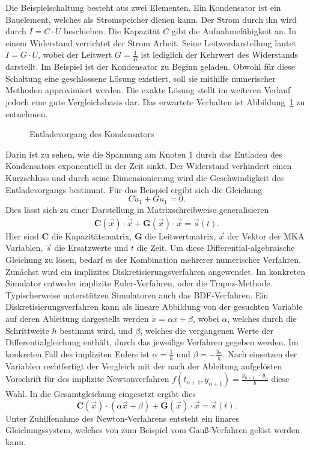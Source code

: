 Die Beispielschaltung besteht aus zwei Elementen. Ein Kondensator ist ein Bauelement, welches als Stromspeicher dienen kann. Der Strom durch ihn wird durch \(I = C \cdot \dot{U}\) beschieben. Die Kapazität \(C\) gibt die Aufnahmefähigkeit an. In einem Widerstand verrichtet der Strom Arbeit. Seine Leitwerdarstellung lautet \(I = G \cdot U\), wobei der Leitwert \(G=\frac{1}{R}\) ist lediglich der Kehrwert des Widerstands darstellt. Im Beispiel ist der Kondensator zu Beginn geladen. Obwohl für diese Schaltung eine geschlossene Lösung existiert, soll sie mithilfe numerischer Methoden approximiert werden. Die exakte Lösung stellt im weiteren Verlauf jedoch eine gute Vergleichsbasis dar. Das erwartete Verhalten ist Abbildung~\ref{fig:entladen} zu entnehmen.
\begin{figure}[ht]
    \centering
    \caption{Entladevorgang des Kondensators}
\label{fig:entladen}
\end{figure}
Darin ist zu sehen, wie die Spannung am Knoten 1 durch das Entladen des Kondensators exponentiell in der Zeit sinkt. Der Widerstand verhindert einen Kurzschluss und durch seine Dimensionierung wird die Geschwindigkeit des Entladevorgangs bestimmt. Für das Beispiel ergibt sich die Gleichung
\begin{displaymath}
    C\dot{u}_1 + Gu_1 = 0.
\end{displaymath}
Dies lässt sich zu einer Darstellung in Matrixschreibweise generalisieren
\begin{displaymath}
    \mathbf{C}(\vec{x}) \cdot \dot{\vec{x}} + \mathbf{G}(\vec{x}) \cdot  \vec{x} = \vec{s}(t).
\end{displaymath}
Hier sind $\mathbf{C}$ die Kapazitätsmatrix, $\mathbf{G}$ die Leitwertmatrix, $\vec{x}$ der Vektor der MKA Variablen, $\vec{s}$ die Ersatzwerte und $t$ die Zeit. Um diese Differential-algebraische Gleichung zu lösen, bedarf es der Kombination mehrerer numerischer Verfahren. Zunächst wird ein implizites Diskretisierungsverfahren angewendet. Im konkreten Simulator entweder implizite Euler-Verfahren, oder die Trapez-Methode. Typischerweise unterstützen Simulatoren auch das BDF-Verfahren. Ein Diskretisierungsverfahren kann als lineare Abbildung von der gesuchten Variable auf deren Ableitung dargestellt werden \(\dot{x} = \alpha x + \beta\), wobei \(\alpha\), welches durch die Schrittweite \(h\) bestimmt wird, und \(\beta\), welches die vergangenen Werte der Differentialgleichung enthält, durch das jeweilige Verfahren gegeben werden. Im konkreten Fall des impliziten Eulers ist \(\alpha = \frac{1}{h}\) und \(\beta = - \frac{y_n}{h}\). Nach einsetzen der Variablen rechtfertigt der Vergleich mit der nach der Ableitung aufgelösten Vorschrift für des implizite Newtonverfahren \(f(t_{n+1},y_{n+1}) = \frac{y_{n+1} - y_n}{h}\) diese Wahl. In die Gesamtgleichung eingesetzt ergibt dies
\begin{displaymath}
    \mathbf{C}(\vec{x}) \cdot (\alpha \vec{x} + \beta) + \mathbf{G}(\vec{x}) \cdot  \vec{x} = \vec{s}(t).
\end{displaymath}
Unter Zuhilfenahme des Newton-Verfahrens entsteht ein linares Gleichungssystem, welches von zum Beispiel vom Gauß-Verfahren gelöst werden kann.